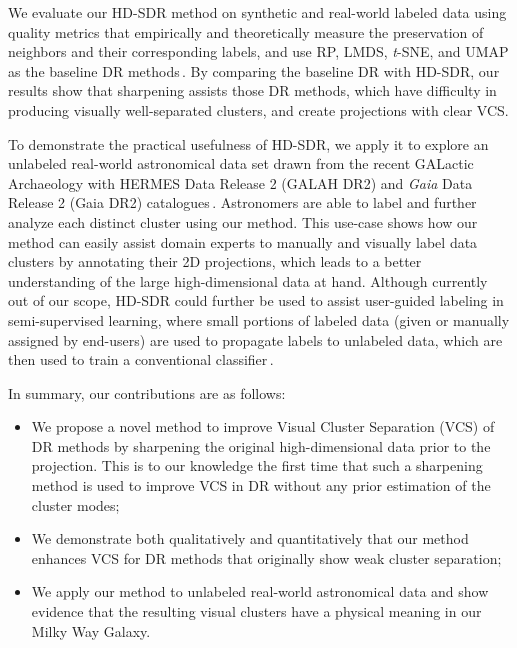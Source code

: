 \documentclass[sagev,Afour,times]{sagej}
\begin{document}
We evaluate our HD-SDR method on synthetic and real-world labeled data using quality metrics that empirically and theoretically measure the preservation of neighbors and their corresponding labels, and use RP, LMDS, \emph{t}-SNE, and UMAP as the baseline DR methods\,\cite{RP1:randomProj,lmds:original,tsne:original,umap2018}. By comparing the baseline DR with HD-SDR, our results show that sharpening assists those DR methods, which have difficulty in producing visually well-separated clusters, and create projections with clear VCS.

To demonstrate the practical usefulness of HD-SDR, we apply it to explore an unlabeled real-world astronomical data set drawn from the recent GALactic Archaeology with HERMES Data Release 2 (GALAH DR2) and \emph{Gaia} Data Release 2 (Gaia DR2) catalogues\,\cite{astro:GAIADR2_1, astro:GAIADR2_2, astro:GALAHDR2, tsne:astro}. Astronomers are able to label and further analyze each distinct cluster using our method. This use-case shows how our method can easily assist domain experts to manually and visually label data clusters by annotating their 2D projections, which leads to a better understanding of the large high-dimensional data at hand. Although currently out of our scope, HD-SDR could further be used to assist user-guided labeling in semi-supervised learning, where small portions of labeled data (given or manually assigned by end-users) are used to propagate labels to unlabeled data, which are then used to train a conventional classifier\,\cite{label_propagation_wang2007,semisupervised_clustering_userfeedback2003,barbara2018,benato21,labeling_wt_DR2017}.

In summary, our contributions are as follows:

\begin{itemize}
    \item We propose a novel method to improve Visual Cluster Separation (VCS) of DR methods by sharpening the original high-dimensional data prior to the projection. This is to our knowledge the first time that such a sharpening method is used to improve VCS in DR without any prior estimation of the cluster modes;
    \item We demonstrate both qualitatively and quantitatively that our method enhances VCS for DR methods that originally show weak cluster separation;
    \item We apply our method to unlabeled real-world astronomical data and show evidence that the resulting visual clusters have a physical meaning in our Milky Way Galaxy.
\end{itemize}
\end{document}
